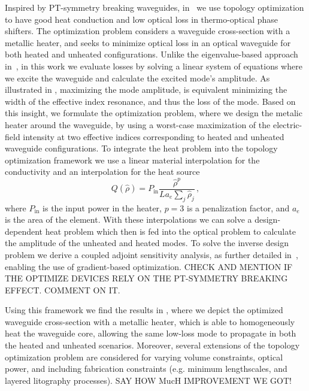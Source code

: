 Inspired by PT-symmetry breaking waveguides, in~\cite{ownpub0} we use topology optimization to have good heat conduction and low optical loss in thermo-optical phase shifters.
The optimization problem considers a waveguide cross-section with a metallic heater, and seeks to minimize optical loss in an optical waveguide for both heated and 
unheated configurations. Unlike the eigenvalue-based approach in~\cite{lipson}, in this work we evaluate losses by solving a linear system of equations where we excite the waveguide 
and calculate the excited mode's 
amplitude. As illustrated in , maximizing the mode amplitude, is equivalent minimizing the width of the effective 
index resonance, and thus the loss of the mode. Based on this insight, we formulate the optimization problem, where we design the metalic heater around the waveguide, by using a worst-case maximization 
of the electric-field intensity at two effective indices corresponding to heated and unheated 
waveguide configurations. To integrate the heat problem into the topology optimization framework we use a linear material interpolation 
for the conductivity and an interpolation for the heat source
\begin{equation}
    Q(\hat{\rho})=P_{\text{in}} \frac{\hat{\rho}^p}{L a_e \sum_j \hat{\rho}_j}\,,
\end{equation}
where $P_\text{in}$ is the input power in the heater, $p=3$ is a penalization factor, and $a_e$ is the area of the element. With these interpolations we can solve a design-dependent
heat problem which then is fed into the optical problem to calculate the amplitude of the unheated and heated modes. To solve the inverse design
problem we derive a coupled adjoint sensitivity analysis, as further detailed in~\cite{ownpub0}, enabling the use of gradient-based optimization. CHECK AND
MENTION IF THE OPTIMIZE DEVICES RELY ON THE PT-SYMMETRY BREAKING EFFECT. COMMENT ON IT.

Using this framework we find the results in , where we depict the optimized waveguide cross-section with a metallic heater, which is able to homogeneously heat the waveguide core,
allowing the same low-loss mode to propagate in both the heated and unheated scenarios. Moreover, several extensions of the topology optimization problem are considered for varying volume constraints, optical power, and including fabrication constraints (e.g. minimum lengthscales, and layered 
litography processes). SAY HOW MucH IMPROVEMENT WE GOT!

